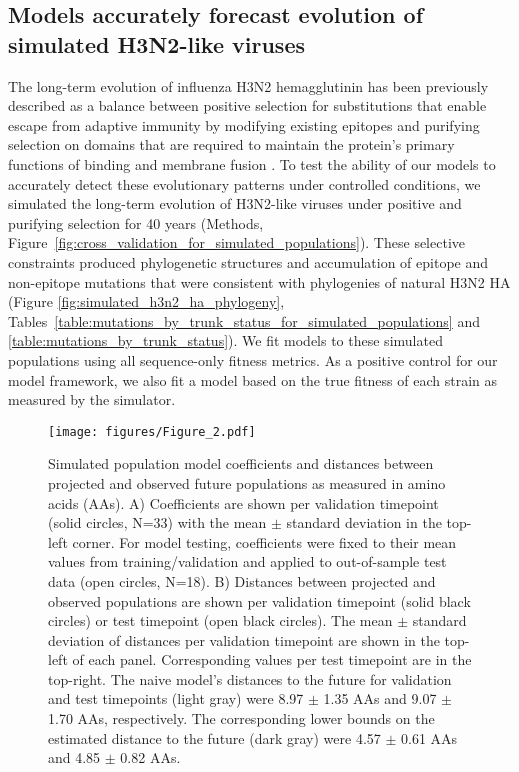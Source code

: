 \subsection*{Models accurately forecast evolution of simulated H3N2-like viruses}

The long-term evolution of influenza H3N2 hemagglutinin has been previously described as a balance between positive selection for substitutions that enable escape from adaptive immunity by modifying existing epitopes and purifying selection on domains that are required to maintain the protein's primary functions of binding and membrane fusion \citep{Bush:1999vj,Neher2013,Luksza:2014hj,Koelle:2015dh}.
To test the ability of our models to accurately detect these evolutionary patterns under controlled conditions, we simulated the long-term evolution of H3N2-like viruses under positive and purifying selection for 40 years (Methods, Figure~\ref{fig:cross_validation_for_simulated_populations}).
These selective constraints produced phylogenetic structures and accumulation of epitope and non-epitope mutations that were consistent with phylogenies of natural H3N2 HA (Figure \ref{fig:simulated_h3n2_ha_phylogeny}, Tables~\ref{table:mutations_by_trunk_status_for_simulated_populations} and \ref{table:mutations_by_trunk_status}).
We fit models to these simulated populations using all sequence-only fitness metrics.
As a positive control for our model framework, we also fit a model based on the true fitness of each strain as measured by the simulator.

\begin{figure}[htb]
  \begin{center}
  \texttt{[image: figures/Figure\_2.pdf]}
  \caption{
    Simulated population model coefficients and distances between projected and observed future populations as measured in amino acids (AAs).
    A) Coefficients are shown per validation timepoint (solid circles, N=33) with the mean $\pm$ standard deviation in the top-left corner.
    For model testing, coefficients were fixed to their mean values from training/validation and applied to out-of-sample test data (open circles, N=18).
    B) Distances between projected and observed populations are shown per validation timepoint (solid black circles) or test timepoint (open black circles).
    The mean $\pm$ standard deviation of distances per validation timepoint are shown in the top-left of each panel.
    Corresponding values per test timepoint are in the top-right.
    The naive model's distances to the future for validation and test timepoints (light gray) were 8.97 $\pm$ 1.35 AAs and 9.07 $\pm$ 1.70 AAs, respectively.
    The corresponding lower bounds on the estimated distance to the future (dark gray) were 4.57 $\pm$ 0.61 AAs and 4.85 $\pm$ 0.82 AAs.
  }
  \label{fig:unadjusted_model_accuracy_and_coefficients_for_simulated_populations_controls}
  \end{center}
\end{figure}

